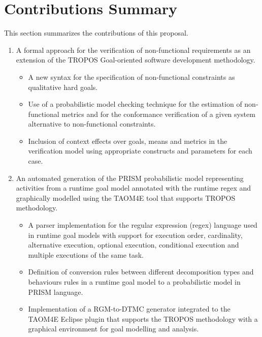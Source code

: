 \section{Contributions Summary}

This section summarizes the contributions of this proposal.


\begin{enumerate}

\item A formal approach for the verification of non-functional requirements as an extension of the TROPOS Goal-oriented software development methodology.
\begin{itemize}

\item A new syntax for the specification of non-functional constraints as qualitative hard goals.
\medskip

\item Use of a probabilistic model checking technique for the estimation of non-functional metrics and for the conformance verification of a given system alternative to non-functional constraints.
\medskip

\item Inclusion of context effects over goals, means and metrics in the verification model using appropriate constructs and parameters for each case.
\end{itemize}
\bigskip

\item An automated generation of the PRISM probabilistic model representing activities from a runtime goal model annotated with the runtime regex and graphically modelled using the TAOM4E tool that supports TROPOS methodology.
\begin{itemize}

\item A parser implementation for the regular expression (regex) language used in runtime goal models with support for execution order, cardinality, alternative execution, optional execution, conditional execution and multiple executions of the same task. 
\medskip

\item Definition of conversion rules between different decomposition types and behaviours rules in a runtime goal model to a probabilistic model in PRISM language.
\medskip

\item Implementation of a RGM-to-DTMC generator integrated to the TAOM4E Eclipse plugin that supports the TROPOS methodology with a graphical environment for goal modelling and analysis.
\end{itemize}

\end{enumerate}

